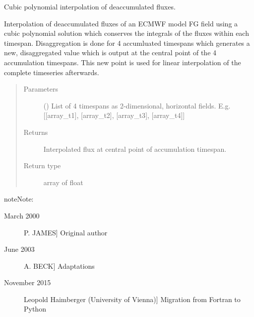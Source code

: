 \documentclass[letterpaper,10pt,english]{sphinxmanual}
\begin{document}

\begin{fulllineitems}
\label{\detokenize{api:disaggregation.dapoly}}
Cubic polynomial interpolation of deaccumulated fluxes.

Interpolation of deaccumulated fluxes of an ECMWF model FG field
using a cubic polynomial solution which conserves the integrals
of the fluxes within each timespan.
Disaggregation is done for 4 accumluated timespans which
generates a new, disaggregated value which is output at the
central point of the 4 accumulation timespans.
This new point is used for linear interpolation of the complete
timeseries afterwards.
\begin{quote}\begin{description}
\item[{Parameters}] \leavevmode
{} () \textendash{} List of 4 timespans as 2-dimensional, horizontal fields.
E.g. {[}{[}array\_t1{]}, {[}array\_t2{]}, {[}array\_t3{]}, {[}array\_t4{]}{]}

\item[{Returns}] \leavevmode
{} \textendash{} Interpolated flux at central point of accumulation timespan.

\item[{Return type}] \leavevmode
array of float

\end{description}\end{quote}

\begin{sphinxadmonition}{note}{Note:}\begin{description}
\item[{March 2000}] \leavevmode{[}P. JAMES{]}
Original author

\item[{June 2003}] \leavevmode{[}A. BECK{]}
Adaptations

\item[{November 2015}] \leavevmode{[}Leopold Haimberger (University of Vienna){]}
Migration from Fortran to Python

\end{description}
\end{sphinxadmonition}

\end{fulllineitems}
\end{document}

